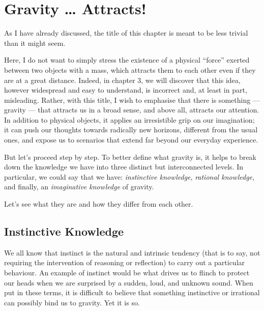 
\chapter{Gravity … Attracts!}\label{ch:01}

As I have already discussed, the title of this chapter is meant to be less trivial than
it might seem.

Here, I do not want to simply stress the existence of a physical ``force'' exerted
between two objects with a mass, which attracts them to each other even if they are at a
great distance. Indeed, in chapter 3, we will discover that this idea, however
widespread and easy to understand, is incorrect and, at least in part, misleading.
Rather, with this title, I wish to emphasise that there is something --- gravity ---
that attracts us in a broad sense, and above all, attracts our attention. In addition to
physical objects, it applies an irresistible grip on our imagination; it can push our
thoughts towards radically new horizons, different from the usual ones, and expose us to
scenarios that extend far beyond our everyday experience.

But let's proceed step by step. To better define what gravity is, it helps to break down
the knowledge we have into three distinct but interconnected levels. In particular, we
could say that we have: \emph{instinctive knowledge},
\emph{rational knowledge}\emph{,} and finally, an
\emph{imaginative knowledge} of gravity.

Let's see what they are and how they differ from each other.

\section{Instinctive Knowledge}\label{sec:01-instinctive}

We all know that instinct is the natural and intrinsic tendency (that is to say, not
requiring the intervention of reasoning or reflection) to carry out a particular
behaviour. An example of instinct would be what drives us to flinch to protect our heads
when we are surprised by a sudden, loud, and unknown sound. When put in these terms, it
is difficult to believe that something instinctive or irrational can possibly bind us to
gravity. Yet it is so.

